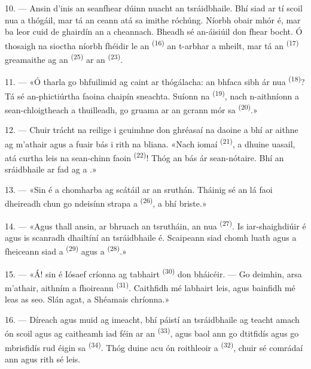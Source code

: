 \VUsaut{3.0mm}
\VUsaut{3.0mm}

10. --- Ansin d'inis an seanfhear dúinn nuacht an tsráidbhaile. Bhí siad ar tí scoil
nua a thógáil, mar tá an ceann atá sa  imithe róchúng. Níorbh
obair mhór é, mar ba leor cuid de ghairdín an  a cheannach.
Bheadh sé an-áisiúil don fhear bocht. Ó thosaigh na sioctha níorbh fhéidir le
 an  \textsuperscript{(16)} an t-arbhar a
mheilt, mar tá an  \textsuperscript{(17)} greamaithe ag an
 \textsuperscript{(25)} ar an 
\textsuperscript{(23)}.

11. --- «Ó tharla go bhfuilimid ag caint ar thógálacha: an bhfaca sibh ár
 nua \textsuperscript{(18)}? Tá sé an-phictiúrtha faoina chaipín
sneachta. Suíonn na  \textsuperscript{(19)}, nach n-aithníonn a
sean-chloigtheach a thuilleadh, go gruama ar an gcrann mór sa
 \textsuperscript{(20)}.»

12. --- Chuir trácht na reilige i gcuimhne don ghréasaí na daoine a bhí ar aithne ag
m'athair agus a fuair bás i rith na bliana. «Nach iomaí 
\textsuperscript{(21)}, a dhuine uasail, atá curtha leis na sean-chinn faoin
 \textsuperscript{(22)}! Thóg an bás ár sean-nótaire. Bhí an
sráidbhaile ar fad ag a .»

13. --- «Sin é a chomharba ag scátáil ar an sruthán. Tháinig sé an lá faoi dheireadh
chun go ndeisínn strapa a  \textsuperscript{(26)}, a bhí briste.»

14. --- «Agus thall ansin, ar bhruach an tsrutháin, an  nua
\textsuperscript{(27)}. Is iar-shaighdiúir é agus is scanradh dhailtíní an
tsráidbhaile é. Scaipeann siad chomh luath agus a fheiceann siad a
 \textsuperscript{(29)} agus a 
\textsuperscript{(28)}.»

15. --- «Á! sin é Iósaef críonna ag tabhairt 
\textsuperscript{(30)} don bháicéir. --- Go deimhin, arsa m'athair, aithním a
fhoireann  \textsuperscript{(31)}. Caithfidh mé labhairt leis, agus
bainfidh mé leas as seo. Slán agat, a Shéamais chríonna.»

16. --- Díreach agus muid ag imeacht, bhí páistí an tsráidbhaile ag teacht amach ón
scoil agus ag caitheamh iad féin ar an 
\textsuperscript{(33)}, agus baol ann go dtitfidís agus go mbrisfidís rud éigin sa
 \textsuperscript{(34)}. Thóg duine acu ón roithleoir a
 \textsuperscript{(32)}, chuir sé comrádaí ann agus rith sé leis.

